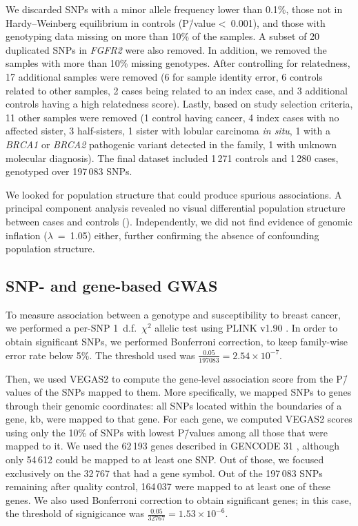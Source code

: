 \documentclass[10pt,letterpaper]{article}
\begin{document}
We discarded SNPs with a minor allele frequency lower than 0.1\%, those not in Hardy--Weinberg equilibrium in controls (P\=/value \textless~0.001), and those with genotyping data missing on more than 10\% of the samples. A subset of 20 duplicated SNPs in \emph{FGFR2} were also removed. In addition, we removed the samples with more than 10\% missing genotypes. After controlling for relatedness, 17 additional samples were removed (6 for sample identity error, 6 controls related to other samples, 2 cases being related to an index case, and 3 additional controls having a high relatedness score). Lastly, based on study selection criteria, 11 other samples were removed (1 control having cancer, 4 index cases with no affected sister, 3 half-sisters, 1 sister with lobular carcinoma \emph{in situ}, 1 with a \emph{BRCA1} or \emph{BRCA2} pathogenic variant detected in the family, 1 with unknown molecular diagnosis). The final dataset included 1\,271 controls and 1\,280 cases, genotyped over 197\,083 SNPs. 

We looked for population structure that could produce spurious associations. A principal component analysis revealed no visual differential population structure between cases and controls (). Independently, we did not find evidence of genomic inflation (\(\lambda\)~=~1.05) either, further confirming the absence of confounding population structure.

\subsection{SNP- and gene-based GWAS}
\label{methods:conventional}

To measure association between a genotype and susceptibility to breast cancer, we performed a per-SNP 1~d.f.~$\chi^2$ allelic test using PLINK v1.90 \cite{chang_second-generation_2015}. In order to obtain significant SNPs, we performed Bonferroni correction, to keep family-wise error rate below 5\%. The threshold used was $\frac {0.05} {197083} = 2.54 \times 10^{-7}$.

Then, we used VEGAS2 \cite{mishra_vegas2:_2015} to compute the gene-level association score from the P\=/values of the SNPs mapped to them. More specifically, we mapped SNPs to genes through their genomic coordinates: all SNPs located within the boundaries of a gene,  kb, were mapped to that gene. For each gene, we computed VEGAS2 scores using only the 10\% of SNPs with lowest P\=/values among all those that were mapped to it.  We used the 62\,193 genes described in GENCODE 31 \cite{frankish_gencode_2019}, although only 54\,612 could be mapped to at least one SNP. Out of those, we focused exclusively on the 32\,767 that had a gene symbol. Out of the 197\,083 SNPs remaining after quality control, 164\,037 were mapped to at least one of these genes. We also used Bonferroni correction to obtain significant genes; in this case, the threshold of signigicance was $\frac {0.05} {32767} = 1.53 \times 10^{-6}$. 
\end{document}
